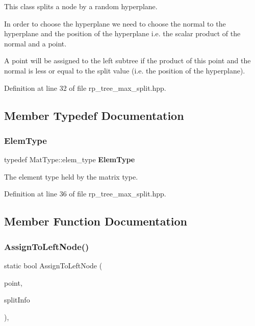This class splits a node by a random hyperplane. 

In order to choose the hyperplane we need to choose the normal to the hyperplane and the position of the hyperplane i.\+e. the scalar product of the normal and a point.

A point will be assigned to the left subtree if the product of this point and the normal is less or equal to the split value (i.\+e. the position of the hyperplane). 

Definition at line 32 of file rp\+\_\+tree\+\_\+max\+\_\+split.\+hpp.



\subsection{Member Typedef Documentation}
\mbox{\label{classmlpack_1_1tree_1_1RPTreeMaxSplit_a227d0c7e23e98fcd6c81ecab357a791f}} 
\subsubsection{Elem\+Type}
{\footnotesize\ttfamily typedef Mat\+Type\+::elem\+\_\+type \textbf{ Elem\+Type}}



The element type held by the matrix type. 



Definition at line 36 of file rp\+\_\+tree\+\_\+max\+\_\+split.\+hpp.



\subsection{Member Function Documentation}
\mbox{\label{classmlpack_1_1tree_1_1RPTreeMaxSplit_af0fc61f469596cb8796d1966564ecbcb}} 
\subsubsection{Assign\+To\+Left\+Node()}
{\footnotesize\ttfamily static bool Assign\+To\+Left\+Node (\begin{DoxyParamCaption}\item[{const Vec\+Type \&}]{point,  }\item[{const \textbf{ Split\+Info} \&}]{split\+Info }\end{DoxyParamCaption})\hspace{0.3cm}{\ttfamily [inline]}, {\ttfamily [static]}}



